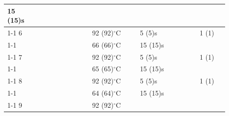\documentclass[UTF8,10pt,a4paper,fontset=fandol]{ctexart}
\newcommand{\fieldvalue}[1]{#1}
\newcommand{\handwritten}[1]{#1}
\begin{document}
\begin{tabular}{|p{0.08\linewidth}|p{0.25\linewidth}|p{0.20\linewidth}|p{0.25\linewidth}|p{0.12\linewidth}|}
\fieldvalue{\handwritten{15}} (15)s &
\\ \cline{1-1}\cline{3-5}
6 & &
\fieldvalue{\handwritten{92}} (92)$^\circ$C &
\fieldvalue{\handwritten{5}} (5)s &
\fieldvalue{\handwritten{1}} (1)
\\ \cline{1-1}\cline{3-5}
& &
\fieldvalue{\handwritten{66}} (66)$^\circ$C &
\fieldvalue{\handwritten{15}} (15)s &
\\ \cline{1-1}\cline{3-5}
7 & &
\fieldvalue{\handwritten{92}} (92)$^\circ$C &
\fieldvalue{\handwritten{5}} (5)s &
\fieldvalue{\handwritten{1}} (1)
\\ \cline{1-1}\cline{3-5}
& &
\fieldvalue{\handwritten{65}} (65)$^\circ$C &
\fieldvalue{\handwritten{15}} (15)s &
\\ \cline{1-1}\cline{3-5}
8 & &
\fieldvalue{\handwritten{92}} (92)$^\circ$C &
\fieldvalue{\handwritten{5}} (5)s &
\fieldvalue{\handwritten{1}} (1)
\\ \cline{1-1}\cline{3-5}
& &
\fieldvalue{\handwritten{64}} (64)$^\circ$C &
\fieldvalue{\handwritten{15}} (15)s &
\\ \cline{1-1}\cline{3-5}
9 & &
\fieldvalue{\handwritten{92}} (92)$^\circ$C &

\end{tabular}
\end{document}
